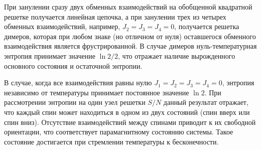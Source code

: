\documentclass[utf8,12pt]{jetp}
\begin{document}
При занулении сразу двух обменных взаимодействий на обобщенной квадратной решетке получается линейная цепочка, а при занулении трех из четырех обменных взаимодействий, например, $J_2 = J_3 = J_4 = 0$, получается решетка димеров, которая при любом знаке (но отличном от нуля) оставшегося обменного взаимодействия является фрустрированной. В случае димеров нуль-температурная энтропия принимает значение $\ln 2/2$, что отражает наличие вырожденного основного состояния и остаточной энтропии.




В случае, когда все взаимодействия равны нулю $J_1 = J_2 = J_3 = J_4 = 0$, энтропия независимо от температуры принимает постоянное значение $\ln 2$. При рассмотрении энтропии на один узел решетки $S/N$ данный результат отражает, что каждый спин может находиться в одном из двух состояний (спин вверх или спин вниз). Отсутствие взаимодействий между спинами приводит к их свободной ориентации, что соответствует парамагнитному состоянию системы. Такое состояние достигается при стремлении температуры к бесконечности.
\end{document}
